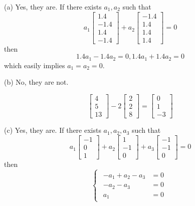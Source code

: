 \documentclass[a4paper, 12pt]{article}
\begin{document}
\begin{problem} [Problem 2]
\end{problem}
\begin{solution}
    (a) Yes, they are. If there exists $a_1, a_2$ such that \[
    a_1 \begin{bmatrix}
        1.4 \\
        -1.4\\
        1.4\\
        -1.4
    \end{bmatrix} + a_2 \begin{bmatrix}
    -1.4\\
    1.4\\
    1.4\\
    1.4
    \end{bmatrix} = 0
    \]
    then \[
    1.4 a_1 - 1.4a_2 = 0, 1.4a_1 + 1.4a_2 = 0
    \]
    which easily implies $a_1 = a_2 = 0$.

    (b) No, they are not.

    \[
    \begin{bmatrix}
        4 \\ 5 \\ 13
    \end{bmatrix} - 2 \begin{bmatrix}
        2 \\ 2 \\ 8
    \end{bmatrix} = \begin{bmatrix}
    0 \\ 1 \\ -3
    \end{bmatrix}
    \]

    (c) Yes, they are. If there exists $a_1, a_2, a_3$ such that \[
    a_1 \begin{bmatrix}
        -1 \\ 0 \\ 1
    \end{bmatrix} + a_2 \begin{bmatrix}
    1 \\ -1 \\ 0
    \end{bmatrix} + a_3 \begin{bmatrix}
    -1 \\ -1 \\ 0
    \end{bmatrix} = 0
    \]
    then \[
        \begin{cases}
        \begin{aligned}
        -a_1 + a_2 - a_3 &= 0 \\
        -a_2 -a_3 &= 0 \\
        a_1 &= 0
        \end{aligned}
        \end{cases}
    \]
    

\end{solution}
\end{document}
